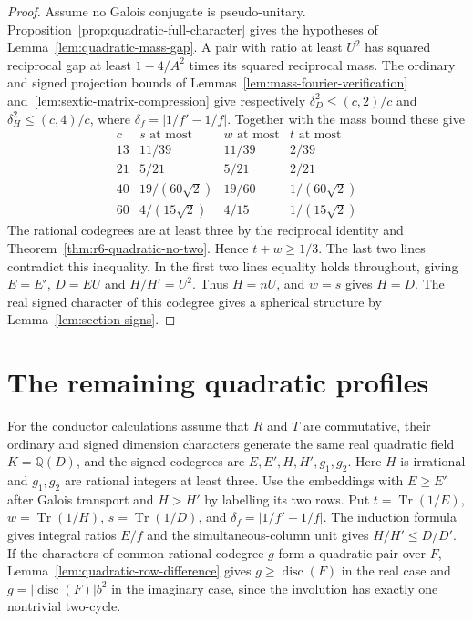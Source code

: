 \documentclass[11pt,reqno]{amsart}
\theoremstyle{remark}\newtheorem{remark}[theorem]{Remark}
\numberwithin{equation}{section}
\begin{document}
\begin{proof}
Assume no Galois conjugate is pseudo-unitary.
Proposition~\ref{prop:quadratic-full-character} gives the hypotheses
of Lemma~\ref{lem:quadratic-mass-gap}. A pair with ratio at least
$U^2$ has squared reciprocal gap at least $1-4/A^2$ times its
squared reciprocal mass. The ordinary and signed projection bounds
of Lemmas~\ref{lem:mass-fourier-verification}
and~\ref{lem:sextic-matrix-compression} give respectively
$\delta_D^2\le(c,2)/c$ and $\delta_H^2\le(c,4)/c$,
where $\delta_f=|1/f'-1/f|$. Together with the mass bound these give
\[
\begin{array}{c|ccc}
 c & s\text{ at most} & w\text{ at most} & t\text{ at most}\\ \hline
 13 & 11/39 & 11/39 & 2/39\\
 21 & 5/21 & 5/21 & 2/21\\
 40 & 19/(60\sqrt2) & 19/60 & 1/(60\sqrt2)\\
 60 & 4/(15\sqrt2) & 4/15 & 1/(15\sqrt2)
\end{array}
\]
The rational codegrees are at least three by the reciprocal identity
and Theorem~\ref{thm:r6-quadratic-no-two}. Hence $t+w\ge1/3$.
The last two lines contradict this inequality. In the first two
lines equality holds throughout, giving $E=E'$, $D=EU$ and
$H/H'=U^2$. Thus $H=nU$, and $w=s$ gives $H=D$. The real signed
character of this codegree gives a spherical structure by
Lemma~\ref{lem:section-signs}.
\end{proof}

\section{The remaining quadratic profiles}
\label{sec:upstream-24-28}
For the conductor calculations assume that $R$ and $T$ are commutative,
their ordinary and signed dimension characters generate the same real
quadratic field $K=\mathbb Q(D)$, and the signed codegrees are
$E,E',H,H',g_1,g_2$. Here $H$ is irrational and $g_1,g_2$ are
rational integers at least three. Use the embeddings with
$E\ge E'$ after Galois transport and $H>H'$ by labelling its two
rows. Put $t=\operatorname{Tr}(1/E)$, $w=\operatorname{Tr}(1/H)$,
$s=\operatorname{Tr}(1/D)$, and
$\delta_f=|1/f'-1/f|$. The induction formula gives integral ratios
$E/f$ and the simultaneous-column unit gives
$H/H'\le D/D'$.
If the characters of common rational codegree $g$ form a quadratic
pair over $F$, Lemma~\ref{lem:quadratic-row-difference} gives
$g\ge\operatorname{disc}(F)$ in the real case and
$g=|\operatorname{disc}(F)|b^2$ in the imaginary case, since the
involution has exactly one nontrivial two-cycle.
\end{document}
